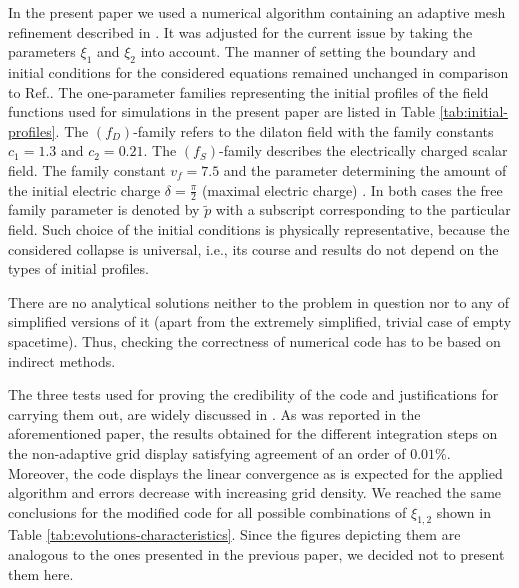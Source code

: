 \documentclass[aps,showpacs,nofootinbib,floatfix]{revtex4}
\newcommand{\tpe}{{\tilde p}}
\begin{document}
In the present paper we used a numerical algorithm containing an adaptive mesh 
refinement described in \cite{bor11}. It was adjusted for the current issue by taking the parameters 
$\xi_1$ and $\xi_2$ into account. The manner of setting the boundary and initial conditions 
for the considered equations remained unchanged in comparison to Ref.\cite{bor11}. The one-parameter 
families representing the initial profiles of the field functions used for simulations in the present paper 
are listed in Table \ref{tab:initial-profiles}. The $\left(f_D\right)$-family refers to the dilaton field 
with the family constants $c_1=1.3$ and $c_2=0.21$. The $\left(f_S\right)$-family describes the 
electrically charged scalar field. The family constant $v_f=7.5$ and the parameter determining the amount of 
the initial electric charge $\delta=\frac{\pi}{2}$ (maximal electric charge) \cite{hwa10}. In both cases 
the free family parameter is denoted by $\tpe$
with a subscript corresponding to the particular field. Such choice of 
the initial conditions is physically representative, because the considered collapse is universal, i.e., its course and results do not depend on the types of initial profiles.

There are no analytical solutions neither to the problem in question nor to any of simplified 
versions of it (apart from the extremely simplified, trivial case of empty spacetime). Thus, 
checking the correctness of numerical code has to be based on indirect methods.

The three tests used for proving the credibility of the code and justifications for carrying them out, 
are widely discussed in \cite{bor11}. As was reported in the 
aforementioned paper, the results obtained for the different integration steps on 
the non-adaptive grid display satisfying agreement of an order of $0.01\%$. Moreover, the code 
displays the linear convergence as is expected for the applied algorithm and errors decrease with 
increasing grid density. We reached the same conclusions for the modified code for all possible combinations 
of $\xi_{1,2}$ shown in Table \ref{tab:evolutions-characteristics}. Since the figures depicting 
them are analogous to the ones presented in the previous paper, we decided not to present them here.
\end{document}
